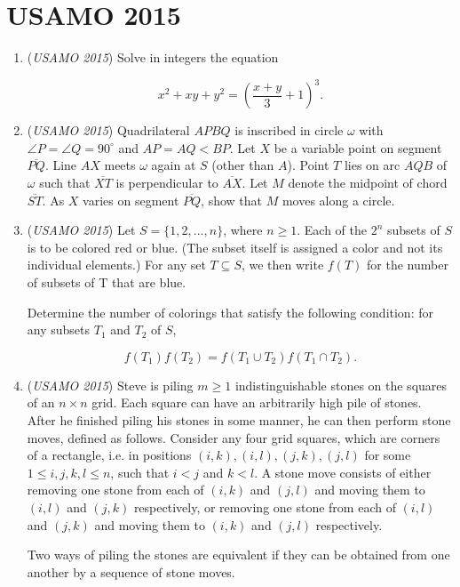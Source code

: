 \section{USAMO 2015}
        \begin{enumerate}
        	\item (\textit{USAMO 2015}) Solve in integers the equation

 \[x^2+xy+y^2 = \left(\frac{x+y}{3}+1\right)^3.\]


	\item (\textit{USAMO 2015}) Quadrilateral $APBQ$ is inscribed in circle $\omega$ with $\angle P = \angle Q = 90^{\circ}$ and $AP = AQ < BP$. Let $X$ be a variable point on segment $\overline{PQ}$. Line $AX$ meets $\omega$ again at $S$ (other than $A$). Point $T$ lies on arc $AQB$ of $\omega$ such that $\overline{XT}$ is perpendicular to $\overline{AX}$. Let $M$ denote the midpoint of chord $\overline{ST}$. As $X$ varies on segment $\overline{PQ}$, show that $M$ moves along a circle.


 

	\item (\textit{USAMO 2015}) Let $S = \{1, 2, ..., n\}$, where $n \ge 1$. Each of the $2^n$ subsets of $S$ is to be colored red or blue. (The subset itself is assigned a color and not its individual elements.) For any set $T \subseteq S$, we then write $f(T)$ for the number of subsets of T that are blue.


 Determine the number of colorings that satisfy the following condition: for any subsets $T_1$ and $T_2$ of $S$,

 \[f(T_1)f(T_2) = f(T_1 \cup T_2)f(T_1 \cap T_2).\]


	\item (\textit{USAMO 2015}) Steve is piling $m\geq 1$ indistinguishable stones on the squares of an $n\times n$ grid. Each square can have an arbitrarily high pile of stones. After he finished piling his stones in some manner, he can then perform stone moves, defined as follows. Consider any four grid squares, which are corners of a rectangle, i.e. in positions $(i, k), (i, l), (j, k), (j, l)$ for some $1\leq i, j, k, l\leq n$, such that $i<j$ and $k<l$. A stone move consists of either removing one stone from each of $(i, k)$ and $(j, l)$ and moving them to $(i, l)$ and $(j, k)$ respectively, or removing one stone from each of $(i, l)$ and $(j, k)$ and moving them to $(i, k)$ and $(j, l)$ respectively.


 Two ways of piling the stones are equivalent if they can be obtained from one another by a sequence of stone moves.



\end{enumerate}
